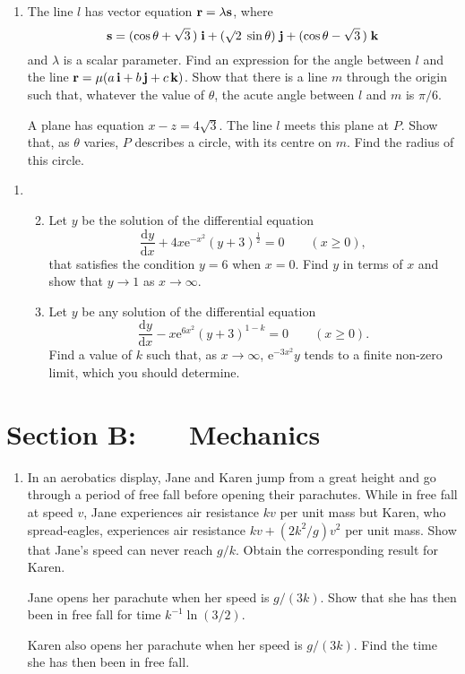 \documentclass[a4, 11pt]{report}
\newlength{\qspace}
\newcounter{qnumber}
\newenvironment{question}%
 {\vspace{\qspace}
  \begin{enumerate}[\bfseries 1\quad][10]%
    \setcounter{enumi}{\value{qnumber}}%
    \item%
 }
{
  \end{enumerate}
  \filbreak
  \stepcounter{qnumber}
 }
\newenvironment{questionparts}[1][1]%
 {
  \begin{enumerate}[\bfseries (i)]%
    \setcounter{enumii}{#1}
    \addtocounter{enumii}{-1}
    \setlength{\itemsep}{5mm}
    \setlength{\parskip}{8pt}
 }
 {
  \end{enumerate}
 }
\def\d{{\mathrm d}}
\def\e{{\mathrm e}}
\def\ge{\geqslant}
\begin{document}
\begin{question}
The  line $l$ has vector equation ${\bf r} = \lambda {\bf s}$,
where 
\[
{\bf s} = (\cos\theta+\sqrt3\,) \; {\bf i} +(\surd2\;\sin\theta)\;{\bf j}
+(\cos\theta-\sqrt3\,)\;{\bf k} 
\]
and $\lambda$ is a scalar parameter. Find an expression for the 
angle between $l$ and the line 
\mbox{${\bf r} = \mu(a\, {\bf i} + b\,{\bf j} +c\,  {\bf k})$}.
Show that there is a line $m$ through the origin
such that, whatever the value of 
 $\theta$, the acute angle between $l$ and $m$ is $\pi/6$.


A plane has  equation  $x-z=4\sqrt3$. The line $l$ meets this plane 
at $P$. Show that, as $\theta$ varies, $P$ describes a circle,
with its centre on $m$. Find the radius of this circle.
\end{question}
		
\begin{question}	




\begin{questionparts}
\item
Let $y$ be the solution of the differential equation
\[
\frac{\d y}{\d x} +  4x\e^{-x^2} {(y+3)}^{\frac12} = 0 \qquad (x \ge 0),
\]
that satisfies the condition $y=6$
when $x=0$.
Find $y$ in terms of $x$ and show that  
$y\to1$ 
as $x \to \infty$.

\item
Let $y$ be any solution of the differential equation
\[
\frac{\d y}{\d x}  -x\e^{6 x^2} (y+3)^{1-k} = 0 \qquad (x \ge 0).
\]
Find a value of  $k$ such that,
as $x \to \infty$,
$\e^{-3x^2}y$ 
tends to a finite non-zero  limit, which you should determine.
\end{questionparts}

\end{question}	
		

		
	
\newpage
\section*{Section B: \ \ \ Mechanics}


	
\begin{question}
In an aerobatics display, Jane  and Karen jump 
from a great height and 
go through a period of free fall before opening their parachutes.
While in free fall at speed  $v$, Jane experiences  air resistance
$kv$ per unit mass but  Karen, who spread-eagles, 
experiences air resistance \mbox{$kv + (2k^2/g)v^2$} per unit mass.
Show that Jane's speed can never reach $g/k$. Obtain the corresponding
result for Karen.

Jane opens her parachute when  her speed is 
$g/(3{k})$. 
Show that she has then been in free fall
for time 
$k^{-1}\ln (3/2)$. 
 
Karen also opens her parachute  when  her speed is 
$g/(3{k})$. Find the time she has then been in free fall.
	\end{question}
	
\end{document}

